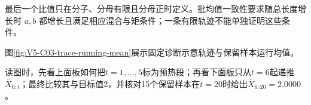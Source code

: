 \documentclass[UTF8,a4paper,11pt,openany]{ctexbook}
\begin{document}
\setcounter{page}{772}
\setcounter{chapter}{32}
\setcounter{figure}{7}
\pagestyle{headings}
最后一个比值只在分子、分母有限且分母正时定义。批均值一致性要求随总长度增长时 $a,b$ 都增长且满足相应混合与矩条件；一条有限轨迹不能单独证明这些条件。

图\ref{fig:V5-C03-trace-running-mean}展示固定诊断示意轨迹与保留样本运行均值。

\FloatBarrier
读图时，先看上面板如何把$t=1,\ldots,5$标为预热段；再看下面板只从$t=6$起递推$\overline X_{6:t}$；最终比较其与目标值2，并核对15个保留样本在$t=20$时给出$\overline X_{6:20}=2.0000$。
\end{document}

